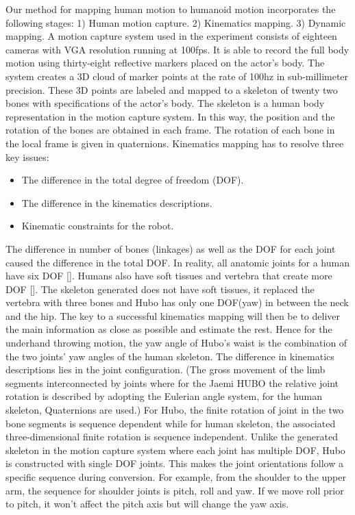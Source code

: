 Our method for mapping human motion to humanoid motion incorporates the following stages: 1) Human motion capture. 2) Kinematics mapping. 3) Dynamic mapping. 
A motion capture system used in the experiment consists of eighteen cameras with VGA resolution running at 100fps. 
It is able to record the full body motion using thirty-eight reflective markers placed on the actor's body. 
The system creates a 3D cloud of marker points at the rate of 100hz in sub-millimeter precision. 
These 3D points are labeled and mapped to a skeleton of twenty two bones with specifications of the actor's body. 
The skeleton is a human body representation in the motion capture system. 
In this way, the position and the rotation of the bones are obtained in each frame.
The rotation of each bone in the local frame is given in quaternions.%
Kinematics mapping has to resolve three key issues: 
\begin{itemize}
	\item The difference in the total degree of freedom (DOF). 
	\item	The difference in the kinematics descriptions. 
	\item	Kinematic constraints for the robot.
\end{itemize}

The difference in number of bones (linkages) as well as the DOF for each joint caused the difference in the total DOF. 
In reality, all anatomic joints for a human have six DOF []. 
Humans also have soft tissues and vertebra that create more DOF []. 
The skeleton generated does not have soft tissues, it replaced the vertebra with three bones and Hubo has only one DOF(yaw) in between the neck and the hip. 
The key to a successful kinematics mapping will then be to deliver the main information as close as possible and estimate the rest. 
Hence for the underhand throwing motion, the yaw angle of Hubo's waist is the combination of the two joints' yaw angles of the human skeleton.  %
The difference in kinematics descriptions lies in the joint configuration. 
(The gross movement of the limb segments interconnected by joints where for the Jaemi HUBO the relative joint rotation is described by adopting the Eulerian angle system, for the human skeleton, Quaternions are used.) 
For Hubo, the finite rotation of joint in the two bone segments is sequence dependent while for human skeleton, the associated three-dimensional finite rotation is sequence independent.
Unlike the generated skeleton in the motion capture system where each joint has multiple DOF, Hubo is constructed with single DOF joints. This makes the joint orientations follow a specific sequence during conversion. For example, from the shoulder to the upper arm, the sequence for shoulder joints is pitch, roll and yaw.  If we move roll prior to pitch, it won't affect the pitch axis but will change the yaw axis.

